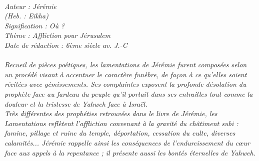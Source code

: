 \BFont
\noindent\hrulefill
{\footnotesize
\textit{
\bigskip
{\centering{}
\\Auteur : Jérémie
\\(Heb. : Eikha)
\\Signification : Où ?
\\Thème : Affliction pour Jérusalem
\\Date de rédaction : 6ème siècle av. J.-C\\}
}
\textit{
\\Recueil de pièces poétiques, les lamentations de Jérémie furent composées selon un procédé visant à accentuer le caractère funèbre, de façon à ce qu’elles soient récitées avec gémissements. Ses complaintes exposent la profonde désolation du prophète face au fardeau du peuple qu’il portait dans ses entrailles tout comme la douleur et la tristesse de Yahweh face à Israël.
\\Très différentes des prophéties retrouvées dans le livre de Jérémie, les Lamentations reflètent l’affliction convenant à la
gravité du châtiment subi : famine, pillage et ruine du temple, déportation, cessation du culte, diverses calamités... Jérémie rappelle ainsi les conséquences de l’endurcissement du cœur face aux appels à la repentance ; il présente aussi les bontés éternelles de Yahweh.\bigskip
}
}
\par\nobreak\noindent\hrulefill
